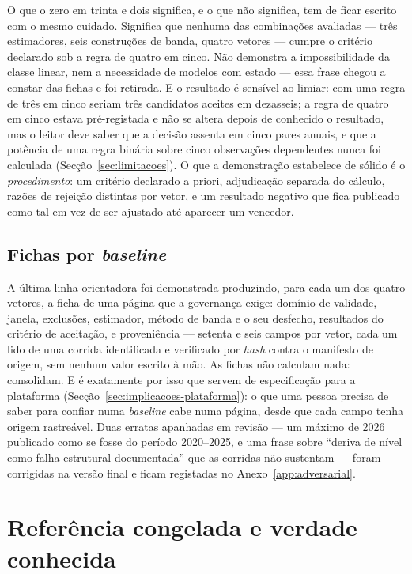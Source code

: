 O que o zero em trinta e dois significa, e o que não significa, tem de ficar
escrito com o mesmo cuidado. Significa que nenhuma das combinações avaliadas
--- três estimadores, seis construções de banda, quatro vetores --- cumpre
o critério declarado sob a regra de quatro em cinco. Não demonstra a
impossibilidade da classe linear, nem a necessidade de modelos com estado
--- essa frase chegou a constar das fichas e foi retirada. E o resultado é
sensível ao limiar: com uma regra de três em cinco seriam três candidatos
aceites em dezasseis; a regra de quatro em cinco estava pré-registada e não
se altera depois de conhecido o resultado, mas o leitor deve saber que a
decisão assenta em cinco pares anuais, e que a potência de uma regra binária
sobre cinco observações dependentes nunca foi calculada (Secção~\ref{sec:limitacoes}).
O que a demonstração estabelece de sólido é o \emph{procedimento}: um
critério declarado a priori, adjudicação separada do cálculo, razões de
rejeição distintas por vetor, e um resultado negativo que fica publicado
como tal em vez de ser ajustado até aparecer um vencedor.

\subsection{Fichas por \emph{baseline}}
\label{sec:demo-fichas}

A última linha orientadora foi demonstrada produzindo, para cada um dos
quatro vetores, a ficha de uma página que a governança exige: domínio de
validade, janela, exclusões, estimador, método de banda e o seu desfecho,
resultados do critério de aceitação, e proveniência --- setenta e seis
campos por vetor, cada um lido de uma corrida identificada e verificado por
\emph{hash} contra o manifesto de origem, sem nenhum valor escrito à mão. As
fichas não calculam nada: consolidam. E é exatamente por isso que servem de
especificação para a plataforma (Secção~\ref{sec:implicacoes-plataforma}): o
que uma pessoa precisa de saber para confiar numa \emph{baseline} cabe numa
página, desde que cada campo tenha origem rastreável. Duas erratas
apanhadas em revisão --- um máximo de 2026 publicado como se fosse do
período 2020--2025, e uma frase sobre ``deriva de nível como falha estrutural
documentada'' que as corridas não sustentam --- foram corrigidas na versão
final e ficam registadas no Anexo~\ref{app:adversarial}.

\section{Referência congelada e verdade conhecida}
\label{sec:referencia-congelada}

